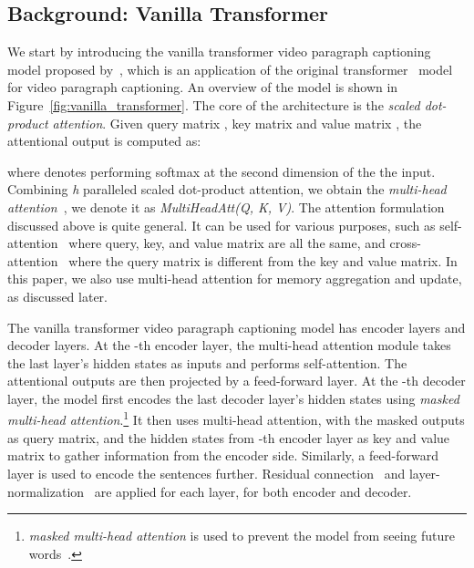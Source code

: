 \documentclass[11pt,a4paper]{article}
\begin{document}
\subsection{Background: Vanilla Transformer}\label{subsec:vanilla_transformer}
We start by introducing the vanilla transformer video paragraph captioning model proposed by~\citet{zhou2018end}, which is an application of the original transformer~\cite{vaswani2017attention} model for video paragraph captioning. 
An overview of the model is shown in Figure~\ref{fig:vanilla_transformer}. 
The core of the architecture is the \textit{scaled dot-product attention}. 
Given query matrix , key matrix  and value matrix , the attentional output is computed as:

where  denotes performing softmax at the second dimension of the the input.
Combining \textit{h} paralleled scaled dot-product attention, we obtain the \textit{multi-head attention}~\cite{vaswani2017attention}, we denote it as \textit{MultiHeadAtt(Q, K, V)}.
The attention formulation discussed above is quite general. It can be used for various purposes, such as self-attention~\cite{vaswani2017attention} where query, key, and value matrix are all the same, and cross-attention~\cite{vaswani2017attention} where the query matrix is different from the key and value matrix. 
In this paper, we also use multi-head attention for memory aggregation and update, as discussed later.

The vanilla transformer video paragraph captioning model has  encoder layers and  decoder layers. At the -th encoder layer, the multi-head attention module takes the last layer's hidden states  as inputs and performs self-attention. The attentional outputs are then projected by a feed-forward layer. 
At the -th decoder layer, the model first encodes the last decoder layer's hidden states using \textit{masked multi-head attention}.\footnote{\textit{masked multi-head attention} is used to prevent the model from seeing future words~\cite{vaswani2017attention}.}
It then uses multi-head attention, with the masked outputs as query matrix, and the hidden states  from -th encoder layer as key and value matrix to gather information from the encoder side. 
Similarly, a feed-forward layer is used to encode the sentences further. 
Residual connection~\cite{he2016deep} and layer-normalization~\cite{ba2016layer} are applied for each layer, for both encoder and decoder.
\end{document}

